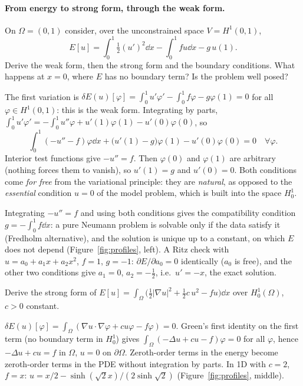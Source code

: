 
\paragraph{From energy to strong form, through the weak form.}

\label{exo:neumann}
%
On $\Omega=(0,1)$ consider, over the unconstrained space $V=H^1(0,1)$,
\[
  E[u]=\int_0^1\tfrac12(u')^2\dd x-\int_0^1fu\dd x-g\,u(1).
\]
Derive the weak form, then the strong form and the boundary conditions. What
happens at $x=0$, where $E$ has no boundary term? Is the problem well posed?
\begin{solution}
The first variation is
$\displaystyle \delta E(u)[\varphi]=\int_0^1u'\varphi'-\int_0^1f\varphi-g\varphi(1)=0$ for
all $\varphi\in H^1(0,1)$: this is the weak form. Integrating by parts,
$\displaystyle \int_0^1u'\varphi'=-\int_0^1u''\varphi+u'(1)\varphi(1)-u'(0)\varphi(0)$, so
\[
  \int_0^1(-u''-f)\varphi\dd x+\bigl(u'(1)-g\bigr)\varphi(1)-u'(0)\varphi(0)=0
  \quad\forall\varphi .
\]
Interior test functions give $-u''=f$. Then $\varphi(0)$ and $\varphi(1)$ are
arbitrary (nothing forces them to vanish), so $u'(1)=g$ and $u'(0)=0$. Both
conditions come \emph{for free} from the variational principle: they are
\emph{natural}, as opposed to the \emph{essential} condition $u=0$ of the
model problem, which is built into the space $H^1_0$.

Integrating $-u''=f$ and using both conditions gives the compatibility
condition $\displaystyle g=-\int_0^1f\dd x$: a pure Neumann problem is solvable only if the
data satisfy it (Fredholm alternative), and the solution is unique up to a
constant, on which $E$ does not depend (Figure~\ref{fig:profiles}, left). A
Ritz check with $u=a_0+a_1x+a_2x^2$, $f=1$, $g=-1$: $\partial E/\partial a_0=0$
identically ($a_0$ is free), and the other two conditions give $a_1=0$,
$a_2=-\tfrac12$, i.e.\ $u'=-x$, the exact solution.

\end{solution}

\label{exo:reaction}
%
Derive the strong form of
$\displaystyle E[u]=\int_\Omega\bigl(\tfrac12|\nabla u|^2+\tfrac12c\,u^2-fu\bigr)\dd x$ over
$H^1_0(\Omega)$, $c>0$ constant.
\begin{solution}
$\displaystyle \delta E(u)[\varphi]=\int_\Omega(\nabla u\cdot\nabla\varphi+cu\varphi-f\varphi)=0$.
Green's first identity on the first term (no boundary term in $H^1_0$) gives
$\displaystyle \int_\Omega(-\Delta u+cu-f)\varphi=0$ for all $\varphi$, hence
$-\Delta u+cu=f$ in $\Omega$, $u=0$ on $\partial\Omega$. Zeroth-order terms in
the energy become zeroth-order terms in the PDE without integration by
parts. In 1D with $c=2$, $f=x$: $u=x/2-\sinh(\sqrt2x)/(2\sinh\sqrt2)$
(Figure~\ref{fig:profiles}, middle).
\end{solution}

